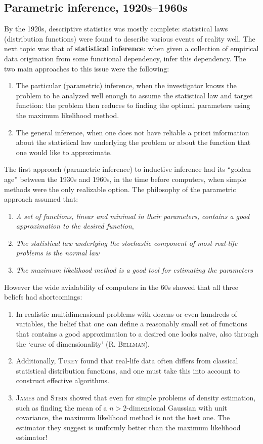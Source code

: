\documentclass{article}
\begin{document}
\subsection{Parametric inference, 1920s--1960s}
By the 1920s, descriptive statistics was mostly complete: statistical laws (distribution functions) were found to describe various events of reality well. The next topic was that of \textbf{statistical inference}: when given a collection of empirical data origination from some functional dependency, infer this dependency. The two main approaches to this issue were the following:
\begin{enumerate}
    \item The particular (parametric) inference, when the investigator knows the problem to be analyzed well enough to assume the statistical law and target function: the problem then reduces to finding the optimal parameters using the maximum likelihood method.
    \item The general inference, when one does not have reliable a priori information about the statistical law underlying the problem or about the function that one would like to approximate.
\end{enumerate}
The first approach (parametric inference) to inductive inference had its ``golden age'' between the 1930s and 1960s, in the time before computers, when simple methods were the only realizable option. The philosophy of the parametric approach assumed that:
\begin{enumerate}
    \item \textit{A set of functions, linear and minimal in their parameters, contains a good approximation to the desired function},
    \item \textit{The statistical law underlying the stochastic component of most real-life problems is the normal law}
    \item \textit{The maximum likelihood method is a good tool for estimating the parameters}
\end{enumerate}
However the wide avialability of computers in the 60s showed that all three beliefs had shortcomings:
\begin{enumerate}
    \item In realistic multidimensional problems with dozens or even hundreds of variables, the belief that one can define a reasonably small set of functions that contains a good approximation to a desired one looks naive, also through the `curse of dimensionality' (\textsc{R. Bellman}).
    \item Additionally, \textsc{Tukey} found that real-life data often differs from classical statistical distribution functions, and one must take this into account to construct effective algorithms.
    \item \textsc{James} and \textsc{Stein} showed that even for simple problems of density estimation, such as finding the mean of a $n>2$-dimensional Gaussian with unit covariance, the maximum likelihood method is not the best one. The estimator they suggest is uniformly better than the maximum likelihood estimator!
\end{enumerate}
\end{document}
